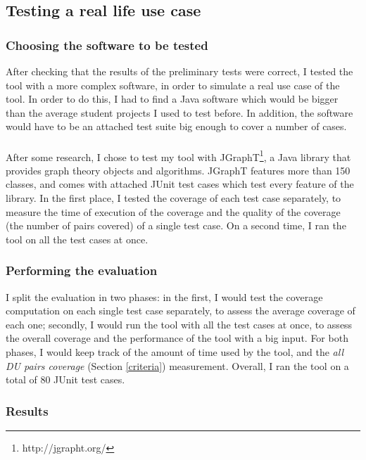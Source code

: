 \subsection{Testing a real life use case}

\subsubsection{Choosing the software to be tested}

After checking that the results of the preliminary tests were correct, I tested the tool with a more complex software, in order to simulate a real use case of the tool. In order to do this, I had to find a Java software which would be bigger than the average student projects I used to test before. In addition, the software would have to be an attached test suite big enough to cover a number of cases.

\paragraph{}
After some research, I chose to test my tool with JGraphT\footnote{http://jgrapht.org/}, a Java library that provides graph theory objects and algorithms. JGraphT features more than 150 classes, and comes with attached JUnit test cases which test every feature of the library. In the first place, I tested the coverage of each test case separately, to measure the time of execution of the coverage and the quality of the coverage (the number of pairs covered) of a single test case. On a second time, I ran the tool on all the test cases at once.

\subsubsection{Performing the evaluation}

I split the evaluation in two phases: in the first, I would test the coverage computation on each single test case separately, to assess the average coverage of each one; secondly, I would run the tool with all the test cases at once, to assess the overall coverage and the performance of the tool with a big input. For both phases, I would keep track of the amount of time used by the tool, and the \textit{all DU pairs coverage} (Section \ref{criteria}) measurement. Overall, I ran the tool on a total of 80 JUnit test cases.


\subsubsection{Results}

